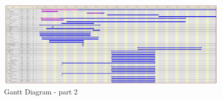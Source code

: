 \begin{figure}[h]
\centering \includegraphics[angle=270, width=1\textwidth, trim=45.5cm 0mm 0mm 0mm, clip]{img/mgmt-gantt.pdf} \caption{Gantt Diagram - part 2}
\label{fig:mgmt-gantt-2}
\end{figure}

